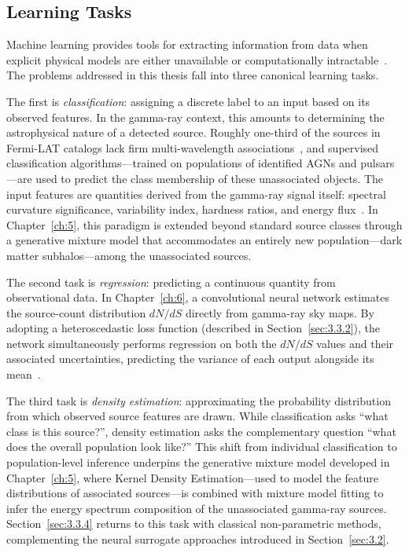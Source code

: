 \subsection{Learning Tasks}
\label{sec:3.3.1}

Machine learning provides tools for extracting information from data when explicit physical models are either unavailable or computationally intractable~\cite{bishop,Hastie:2009}.
The problems addressed in this thesis fall into three canonical learning tasks.

The first is \textit{classification}: assigning a discrete label to an input based on its observed features.
In the gamma-ray context, this amounts to determining the astrophysical nature of a detected source.
Roughly one-third of the sources in Fermi-LAT catalogs lack firm multi-wavelength associations~\cite{Bhat:2022}, and supervised classification algorithms---trained on populations of identified AGNs and pulsars---are used to predict the class membership of these unassociated objects.
The input features are quantities derived from the gamma-ray signal itself: spectral curvature significance, variability index, hardness ratios, and energy flux~\cite{Bhat:2022}.
In Chapter~\ref{ch:5}, this paradigm is extended beyond standard source classes through a generative mixture model that accommodates an entirely new population---dark matter subhalos---among the unassociated sources.

The second task is \textit{regression}: predicting a continuous quantity from observational data.
In Chapter~\ref{ch:6}, a convolutional neural network estimates the source-count distribution $dN/dS$ directly from gamma-ray sky maps.
By adopting a heteroscedastic loss function (described in Section~\ref{sec:3.3.2}), the network simultaneously performs regression on both the $dN/dS$ values and their associated uncertainties, predicting the variance of each output alongside its mean~\cite{heteroscedastic-error}.

The third task is \textit{density estimation}: approximating the probability distribution from which observed source features are drawn.
While classification asks ``what class is this source?'', density estimation asks the complementary question ``what does the overall population look like?''
This shift from individual classification to population-level inference underpins the generative mixture model developed in Chapter~\ref{ch:5}, where Kernel Density Estimation---used to model the feature distributions of associated sources---is combined with mixture model fitting to infer the energy spectrum composition of the unassociated gamma-ray sources.
Section~\ref{sec:3.3.4} returns to this task with classical non-parametric methods, complementing the neural surrogate approaches introduced in Section~\ref{sec:3.2}.

